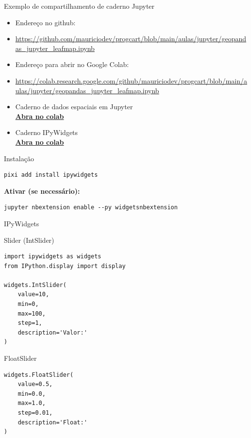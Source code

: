 \documentclass{beamer}
\begin{document}
\begin{frame}{Exemplo de compartilhamento de caderno Jupyter}
\begin{itemize}
    \item Endereço no github: 
    \item \url{ https://github.com/mauriciodev/progcart/blob/main/aulas/jupyter/geopandas_jupyter_leafmap.ipynb}
    \item Endereço para abrir no Google Colab:
    \item \url{https://colab.research.google.com/github/mauriciodev/progcart/blob/main/aulas/jupyter/geopandas_jupyter_leafmap.ipynb}
\end{itemize}

\begin{itemize}
    \item Caderno de dados espaciais em Jupyter \\ \textbf{\href{https://colab.research.google.com/github/mauriciodev/progcart/blob/main/aulas/jupyter/geopandas_jupyter_leafmap.ipynb}{Abra no colab}}
    \item Caderno IPyWidgets \\ \textbf{\href{https://colab.research.google.com/github/mauriciodev/progcart/blob/main/aulas/jupyter/widgets.ipynb}{Abra no colab}}
\end{itemize}

\end{frame}



\begin{frame}[fragile]{Instalação}

\begin{verbatim}
pixi add install ipywidgets
\end{verbatim}

\textbf{Ativar (se necessário):}

\begin{verbatim}
jupyter nbextension enable --py widgetsnbextension
\end{verbatim}

\end{frame}

\begin{frame}[fragile]{IPyWidgets}

Slider (IntSlider)
\begin{verbatim}
import ipywidgets as widgets
from IPython.display import display

widgets.IntSlider(
    value=10,
    min=0,
    max=100,
    step=1,
    description='Valor:'
)
\end{verbatim}

FloatSlider
\begin{verbatim}
widgets.FloatSlider(
    value=0.5,
    min=0.0,
    max=1.0,
    step=0.01,
    description='Float:'
)
\end{verbatim}

\end{frame}
\end{document}
